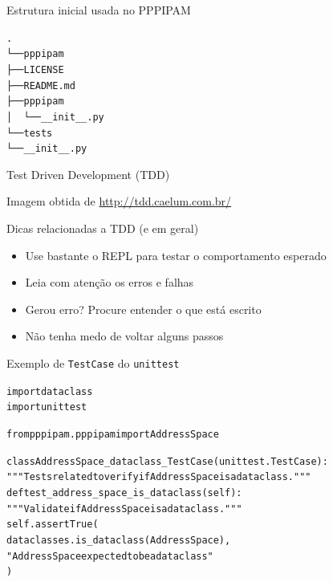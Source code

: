 \documentclass[11pt]{beamer}
\begin{document}
\begin{frame}[fragile]{Estrutura inicial usada no PPPIPAM}
\begin{alltt}
.
└── pppipam
    ├── LICENSE
    ├── README.md
    ├── pppipam
    │   └── __init__.py
    └── tests
        └── __init__.py
\end{alltt}
\end{frame}

\begin{frame}[fragile]{Test Driven Development (TDD)}
  \hspace*{-.5cm}

  \begin{flushright}
  \tiny{\vspace*{.25cm}
    Imagem obtida de \url{http://tdd.caelum.com.br/}}
  \end{flushright}
\end{frame}

\begin{frame}[fragile]{Dicas relacionadas a TDD (e em geral)}
  \begin{itemize}
    \item Use bastante o REPL para testar o comportamento esperado
    \item Leia com atenção os erros e falhas
    \item Gerou erro? Procure entender o que está escrito
    \item Não tenha medo de voltar alguns passos
  \end{itemize}
\end{frame}

\begin{frame}[fragile]{Exemplo de \texttt{TestCase} do \texttt{unittest}}
\begin{alltt}\scriptsize
import dataclass
import unittest

from pppipam.pppipam import AddressSpace

class AddressSpace_dataclass_TestCase(unittest.TestCase):
    """Tests related to verify if AddressSpace is a dataclass."""
    def test_address_space_is_dataclass(self):
        """Validate if AddressSpace is a dataclass."""
        self.assertTrue(
            dataclasses.is_dataclass(AddressSpace),
            "AddressSpace expected to be a dataclass"
        )
\end{alltt}
\end{frame}
\end{document}
